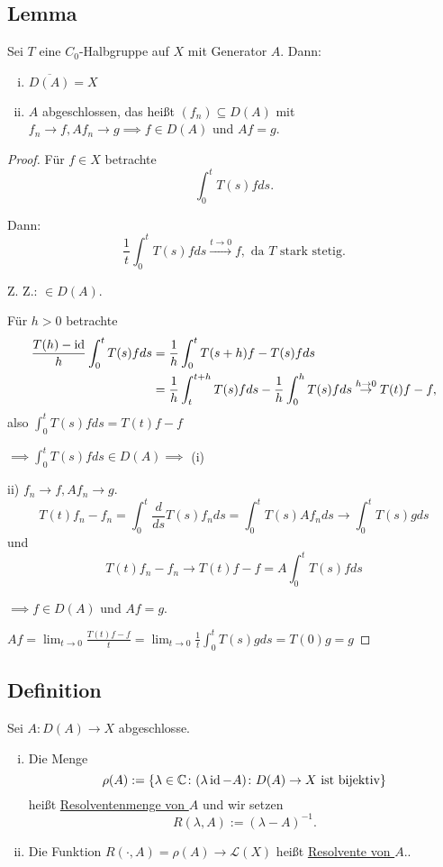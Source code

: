 \subsection{Lemma}

Sei $T$ eine $C_0$-Halbgruppe auf $X$ mit Generator $A$.
Dann:
\begin{enumerate}[i)]
  \item $\overline{D(A)} = X$ 
  \item $A$ abgeschlossen, das heißt $(f_n) \subseteq D(A)$ mit $f_n \to f, Af_n \to g \implies f \in D(A)$ und $A f = g$. 
\end{enumerate}

\begin{proof}
Für $f \in X$ betrachte
$$
\int_0^t T(s) f ds.
$$

Dann:
$$
\frac{1}{t} \int_0^t T(s) f ds \overset{t \to 0}{\to} f, \text{ da $T$ stark stetig}.
$$

Z. Z.: $\in D(A)$.

Für $h > 0$ betrachte
\begin{align*}
\frac{T(h) - \operatorname{id}}{h} \int_0^t T(s) f ds 
&= \frac{1}{h} \int_0^t T(s + h) f - T(s) f ds \\
&= \frac{1}{h} \int_t^{t + h} T(s) f ds - \frac{1}{h} \int_0^h T(s) f ds \overset{h \to 0}{\to} T(t) f - f,
\end{align*}
also $\int_0^t T(s) f ds = T(t) f - f$

$\implies \int_0^t T(s) f ds \in D(A) \implies$ (i)

ii) $f_n \to f, A f_n \to g$.
$$
T(t) f_n - f_n = \int_0^t \frac{d}{ds} T(s) f_n ds = \int_0^tT(s) Af_n ds \to \int_0^t T(s) g ds
$$
und
$$
T(t) f_n - f_n \to T(t) f - f = A \int_0^t T(s) f ds
$$

$\implies f \in D(A)$ und $Af = g$.

{\tiny{$Af = \lim_{t \to 0} \frac{T(t) f - f}{t} = \lim_{t \to 0} \frac{1}{t} \int_0^t T(s) g ds = T(0) g = g$}}
\end{proof}

\subsection{Definition}

Sei $A \colon D(A) \to X$ abgeschlosse.
\begin{enumerate}[i)]
  \item Die Menge
  $$
    \rho(A) := \{ \lambda \in \mathbb{C} \colon (\lambda \operatorname{id} - A) \colon D(A) \to X \text{ ist bijektiv}\}
  $$
  heißt \underline{Resolventenmenge von $A$} und wir setzen
  $$
  R(\lambda, A) := (\lambda - A)^{-1}.
  $$ 
  \item Die Funktion $R(\cdot, A) = \rho(A) \to \mathcal{L}(X)$ heißt \underline{Resolvente von $A$}..
\end{enumerate}

